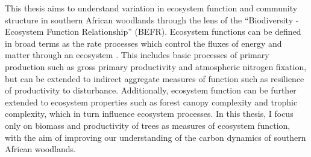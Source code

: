 \begin{refsection}
This thesis aims to understand variation in ecosystem function and community structure in southern African woodlands through the lens of the ``Biodiversity - Ecosystem Function Relationship'' (BEFR). Ecosystem functions can be defined in broad terms as the rate processes which control the fluxes of energy and matter through an ecosystem \citep{Jax2005}. This includes basic processes of primary production such as gross primary productivity and atmospheric nitrogen fixation, but can be extended to indirect aggregate measures of function such as resilience of productivity to disturbance. Additionally, ecosystem function can be further extended to ecosystem properties such as forest canopy complexity and trophic complexity, which in turn influence ecosystem processes. In this thesis, I focus only on biomass and productivity of trees as measures of ecosystem function, with the aim of improving our understanding of the carbon dynamics of southern African woodlands.


\end{refsection}
